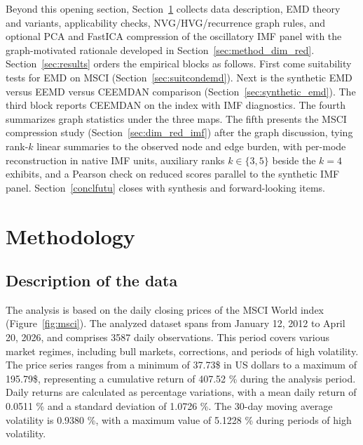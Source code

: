 \documentclass[11pt,a4paper]{article}
\begin{document}
Beyond this opening section, Section~\ref{sec:methodology} collects data description, EMD theory and variants, applicability checks, NVG/HVG/recurrence graph rules, and optional PCA and FastICA compression of the oscillatory IMF panel with the graph-motivated rationale developed in Section~\ref{sec:method_dim_red}. Section~\ref{sec:results} orders the empirical blocks as follows. First come suitability tests for EMD on MSCI (Section~\ref{sec:suitcondemd}). Next is the synthetic EMD versus EEMD versus CEEMDAN comparison (Section~\ref{sec:synthetic_emd}). The third block reports CEEMDAN on the index with IMF diagnostics. The fourth summarizes graph statistics under the three maps. The fifth presents the MSCI compression study (Section~\ref{sec:dim_red_imf}) after the graph discussion, tying rank-$k$ linear summaries to the observed node and edge burden, with per-mode reconstruction in native IMF units, auxiliary ranks $k\in\{3,5\}$ beside the $k=4$ exhibits, and a Pearson check on reduced scores parallel to the synthetic IMF panel. Section~\ref{conclfutu} closes with synthesis and forward-looking items.
\section{Methodology}
\label{sec:methodology}

\subsection{Description of the data}

The analysis is based on the daily closing prices of the MSCI World index (Figure~\ref{fig:msci}). The analyzed dataset spans from January 12, 2012 to April 20, 2026, and comprises 3587 daily observations. This period covers various market regimes, including bull markets, corrections, and periods of high volatility. The price series ranges from a minimum of 37.73\$ in US dollars to a maximum of 195.79\$, representing a cumulative return of 407.52 \% during the analysis period. Daily returns are calculated as percentage variations, with a mean daily return of 0.0511 \% and a standard deviation of 1.0726 \%. The 30-day moving average volatility is 0.9380 \%, with a maximum value of 5.1228 \% during periods of high volatility.
\end{document}
